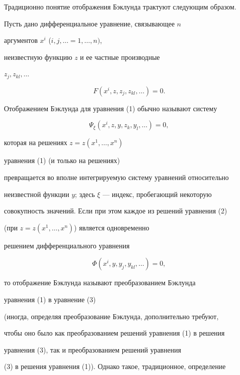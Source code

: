 Традиционно понятие отображения Бэклунда трактуют следующим образом. 


Пусть дано дифференциальное уравнение, связывающее $n$


аргументов $x^i$ ($i,j, \dotsc=1, \dotsc ,n)$, 


неизвестную функцию $z$ и ее частные производные


$z_j,z_{kl}, \dotsc$


\begin{equation}


F ({x^i ,z,z_j ,z_{kl} , \dotsc})=0.


\end{equation}


Отображением Бэклунда для уравнения (1) обычно называют систему


\begin{equation}


\Psi_\xi ({x^i ,z,y,z_k ,y_l , \dotsc})=0,


\end{equation}


которая на решениях $z=z ({x^1, \dotsc,x^n})$ 


уравнения (1) (и только на решениях)


превращается во вполне интегрируемую систему уравнений относительно 


неизвестной функции $y$; здесь $\xi$ --- индекс, пробегающий некоторую 


совокупность значений. Если при этом каждое из решений уравнения (2)


(при $z=z ({x^1, \dotsc,x^n})$) является одновременно 


решением дифференциального уравнения


\begin{equation}


\Phi ({x^i,y,y_j,y_{kl}, \dotsc})=0,


\end{equation}


то отображение Бэклунда называют преобразованием Бэклунда 


уравнения (1) в уравнение (3)


(иногда, определяя преобразование Бэклунда, дополнительно требуют, 


чтобы оно было как преобразованием решений уравнения (1) в решения 


уравнения (3), так и преобразованием решений уравнения


(3) в решения уравнения (1)). Однако такое, традиционное, определение 


